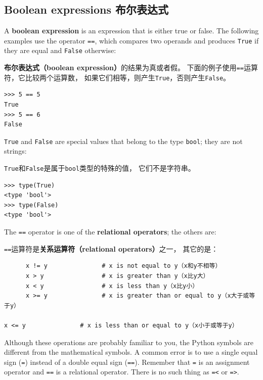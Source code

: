 \documentclass[10pt]{book}
\begin{document}
\begin{CJK}{UTF8}{gbsn}
\section{Boolean expressions 布尔表达式}

A {\bf boolean expression} is an expression that is either true
or false.  The following examples use the 
operator {\tt ==}, which compares two operands and produces
{\tt True} if they are equal and {\tt False} otherwise:

{\bf 布尔表达式（boolean expression）}的结果为真或者假。
下面的例子使用{\tt ==}运算符，它比较两个运算数，
如果它们相等，则产生{\tt True}，否则产生{\tt False}。


\begin{verbatim}
>>> 5 == 5
True
>>> 5 == 6
False
\end{verbatim}
%
{\tt True} and {\tt False} are special
values that belong to the type {\tt bool}; they are not strings:

{\tt True}和{\tt False}是属于{\tt bool}类型的特殊的值，
它们不是字符串。

\begin{verbatim}
>>> type(True)
<type 'bool'>
>>> type(False)
<type 'bool'>
\end{verbatim}
%
The {\tt ==} operator is one of the {\bf relational operators}; the
others are:

{\tt ==}运算符是{\bf 关系运算符（relational operators）}之一，
其它的是：

\begin{verbatim}
      x != y               # x is not equal to y（x和y不相等）
      x > y                # x is greater than y（x比y大）
      x < y                # x is less than y（x比y小）
      x >= y               # x is greater than or equal to y（x大于或等于y）
      x <= y               # x is less than or equal to y（x小于或等于y）
\end{verbatim}
%
Although these operations are probably familiar to you, the Python
symbols are different from the mathematical symbols.  A common error
is to use a single equal sign ({\tt =}) instead of a double equal sign
({\tt ==}).  Remember that {\tt =} is an assignment operator and
{\tt ==} is a relational operator.   There is no such thing as
{\tt =<} or {\tt =>}.


\end{CJK}
\end{document}
